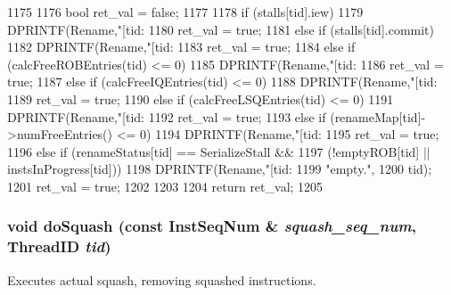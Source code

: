 \begin{DoxyCode}
1175 {
1176     bool ret_val = false;
1177 
1178     if (stalls[tid].iew) {
1179         DPRINTF(Rename,"[tid:%
1180         ret_val = true;
1181     } else if (stalls[tid].commit) {
1182         DPRINTF(Rename,"[tid:%
1183         ret_val = true;
1184     } else if (calcFreeROBEntries(tid) <= 0) {
1185         DPRINTF(Rename,"[tid:%
1186         ret_val = true;
1187     } else if (calcFreeIQEntries(tid) <= 0) {
1188         DPRINTF(Rename,"[tid:%
1189         ret_val = true;
1190     } else if (calcFreeLSQEntries(tid) <= 0) {
1191         DPRINTF(Rename,"[tid:%
1192         ret_val = true;
1193     } else if (renameMap[tid]->numFreeEntries() <= 0) {
1194         DPRINTF(Rename,"[tid:%
1195         ret_val = true;
1196     } else if (renameStatus[tid] == SerializeStall &&
1197                (!emptyROB[tid] || instsInProgress[tid])) {
1198         DPRINTF(Rename,"[tid:%
1199                 "empty.\n",
1200                 tid);
1201         ret_val = true;
1202     }
1203 
1204     return ret_val;
1205 }
\end{DoxyCode}
\hypertarget{classDefaultRename_a32818ae72457917ca9551faa708ba584}{
\subsubsection[{doSquash}]{\setlength{\rightskip}{0pt plus 5cm}void doSquash (const {\bf InstSeqNum} \& {\em squash\_\-seq\_\-num}, \/  {\bf ThreadID} {\em tid})}}
\label{classDefaultRename_a32818ae72457917ca9551faa708ba584}
Executes actual squash, removing squashed instructions. 


